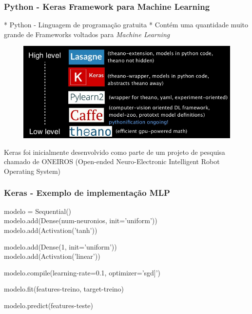 \documentclass[tikz,10pt]{beamer}
\begin{document}
\begin{frame}
	\frametitle{Python - Keras Framework para Machine Learning}
	
	* Python - Linguagem de programação gratuita \newline
	* Contém uma quantidade muito grande de Frameworks voltados para
	\textit{Machine Learning}
	
	
	\begin{figure}
		\centering
		\includegraphics[scale=0.3]{road_map}
	\end{figure}
	
	Keras foi inicialmente desenvolvido como parte de um projeto de
	pesquisa chamado de ONEIROS (Open-ended Neuro-Electronic
	Intelligent Robot Operating System)
	
\end{frame}

\begin{frame}
	\frametitle{Keras - Exemplo de implementação MLP}
	
	
	modelo = Sequential() \\
	modelo.add(Dense(num-neuronios, init='uniform'))\\
	modelo.add(Activation('tanh')) \newline
	
	modelo.add(Dense(1, init='uniform')) \\
	modelo.add(Activation('linear')) \newline
	
	modelo.compile(learning-rate=0.1, optimizer='sgd]') \newline
	
	modelo.fit(features-treino, target-treino) \newline
	
	modelo.predict(features-teste)
	
\end{frame} 
\end{document}
